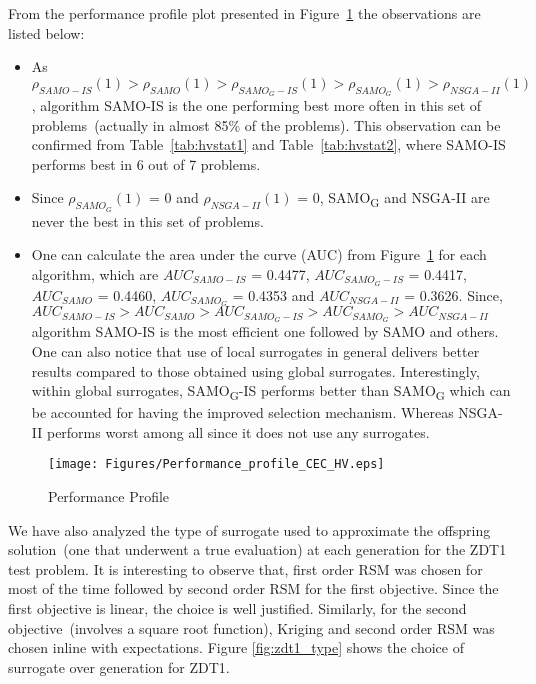 From the performance profile plot presented in Figure~\ref{fig:Perfprofile} the observations are
listed below: \begin{itemize} \item As $\rho_{SAMO-IS}(1) > \rho_{SAMO}(1) > \rho_{SAMO_{G}-IS}(1) >
	\rho_{SAMO_{G}}(1) > \rho_{NSGA-II}(1)$, algorithm SAMO-IS is the one performing best more often in
	this set of problems~(actually in almost 85\% of the problems). This observation can be confirmed
	from Table~\ref{tab:hvstat1} and Table~\ref{tab:hvstat2}, where SAMO-IS performs best in 6 out of 7
	problems. \item Since $\rho_{SAMO_{G}}(1)$ = 0 and $\rho_{NSGA-II}(1)$ = 0, SAMO\textsubscript{G}
	and NSGA-II are never the best in this set of problems. \item One can calculate the area under the curve (AUC) from
	Figure~\ref{fig:Perfprofile} for each algorithm, which are $AUC_{SAMO-IS}$ = 0.4477, $AUC_{SAMO_{G}-IS}$ = 0.4417,
	$AUC_{SAMO}$ = 0.4460, $AUC_{SAMO_{G}}$ = 0.4353 and $AUC_{NSGA-II}$ = 0.3626. Since, $AUC_{SAMO-IS}
	> AUC_{SAMO} > AUC_{SAMO_{G}-IS} > AUC_{SAMO_{G}} > AUC_{NSGA-II}$ algorithm SAMO-IS is the most
	efficient one followed by SAMO and others. One can also notice that use of local surrogates in
	general delivers better results compared to those obtained using global surrogates. Interestingly,
	within global surrogates, SAMO\textsubscript{G}-IS performs better than SAMO\textsubscript{G} which
	can be accounted for having the improved selection mechanism. Whereas NSGA-II performs worst among
	all since it does not use any surrogates. \end{itemize}

\begin{figure}[!htb] \centering
	\texttt{[image: Figures/Performance\_profile\_CEC\_HV.eps]} \caption{Performance
		Profile} \label{fig:Perfprofile} \end{figure}

We have also analyzed the type of surrogate used to approximate the offspring solution~(one that underwent a true evaluation) at each generation for the ZDT1 test problem. It is interesting to observe that, first order RSM was chosen for most of the time followed by second order RSM for the first objective. Since the first objective is linear, the choice is well justified. Similarly, for the second objective~(involves a square root function), Kriging and second order RSM was chosen inline with expectations. Figure \ref{fig:zdt1_type} shows the choice of surrogate over generation for ZDT1.

